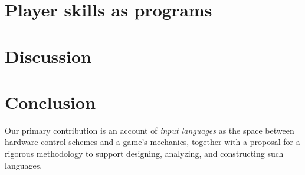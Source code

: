 \documentclass[sigconf]{acmart}
\begin{document}
\section{Player skills as programs}



\section{Discussion}

  
\section{Conclusion}


Our primary contribution is an account of {\em input languages} as the
space between hardware control schemes and a game's mechanics, together
with a proposal for a rigorous methodology to support designing, analyzing,
and constructing such languages.


  



 
\end{document}
